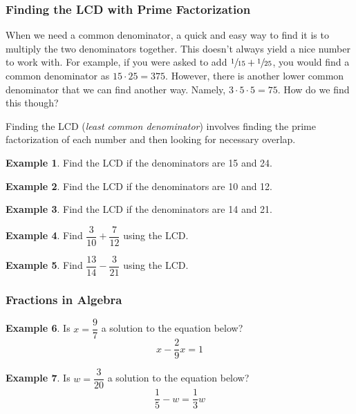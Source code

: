 \documentclass[addpoints,12pt]{exam}
\theoremstyle{definition}
\newtheorem{example}{Example}[subsection]
\begin{document}
\subsubsection*{Finding the LCD with Prime Factorization}
\noindent When we need a common denominator, a quick and easy way to find it is to multiply the two denominators together. This doesn't always yield a nice number to work with. For example, if you were asked to add $\sfrac{1}{15}+\sfrac{1}{25}$, you would find a common denominator as $15\cdot 25 = 375$. However, there is another lower common denominator that we can find another way. Namely, $3\cdot 5\cdot 5 = 75$. How do we find this though?

\vspace{.25in}

\noindent Finding the LCD (\emph{least common denominator}) involves finding the prime factorization of each number and then looking for necessary overlap.

\vspace{.25in}

\begin{example}
Find the LCD if the denominators are 15 and 24.
\vspace{1in}
\end{example}

\begin{example}
Find the LCD if the denominators are 10 and 12.
\vspace{1in}
\end{example}

\begin{example}
Find the LCD if the denominators are 14 and 21.
\vspace{1in}
\end{example}

\begin{example}
Find $\dfrac{3}{10}+\dfrac{7}{12}$ using the LCD.
\vspace{1in}
\end{example}

\newpage

\begin{example}
Find $\dfrac{13}{14}-\dfrac{3}{21}$ using the LCD.
\vspace{1.5in}
\end{example}

\subsubsection*{Fractions in Algebra}

\begin{example}
Is $x = \dfrac{9}{7}$ a solution to the equation below? \[x - \dfrac{2}{9}x = 1\]
\vspace{1.5in}
\end{example}

\begin{example}
Is $w = \dfrac{3}{20}$ a solution to the equation below? \[\dfrac{1}{5}-w = \dfrac{1}{3}w\]
\vspace{1.5in}
\end{example}
\end{document}
